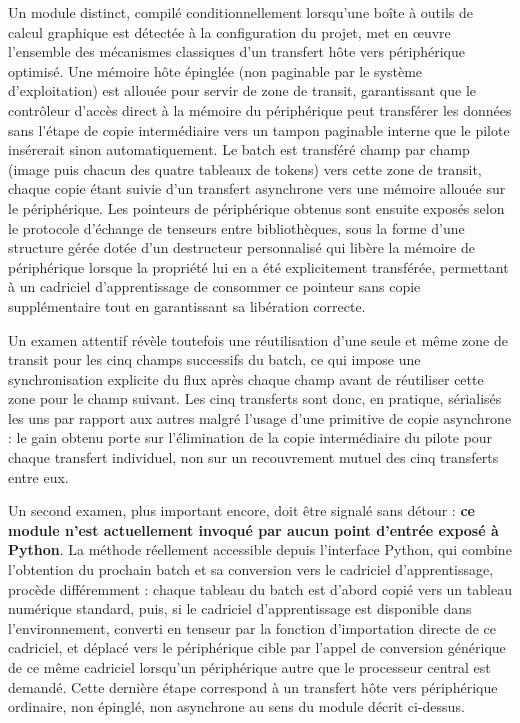 \documentclass[12pt,a4paper]{report}
\begin{document}
Un module distinct, compilé conditionnellement lorsqu'une boîte à outils de calcul graphique est détectée à la configuration du projet, met en œuvre l'ensemble des mécanismes classiques d'un transfert hôte vers périphérique optimisé. Une mémoire hôte épinglée (non paginable par le système d'exploitation) est allouée pour servir de zone de transit, garantissant que le contrôleur d'accès direct à la mémoire du périphérique peut transférer les données sans l'étape de copie intermédiaire vers un tampon paginable interne que le pilote insérerait sinon automatiquement. Le batch est transféré champ par champ (image puis chacun des quatre tableaux de tokens) vers cette zone de transit, chaque copie étant suivie d'un transfert asynchrone vers une mémoire allouée sur le périphérique. Les pointeurs de périphérique obtenus sont ensuite exposés selon le protocole d'échange de tenseurs entre bibliothèques, sous la forme d'une structure gérée dotée d'un destructeur personnalisé qui libère la mémoire de périphérique lorsque la propriété lui en a été explicitement transférée, permettant à un cadriciel d'apprentissage de consommer ce pointeur sans copie supplémentaire tout en garantissant sa libération correcte.

Un examen attentif révèle toutefois une réutilisation d'une seule et même zone de transit pour les cinq champs successifs du batch, ce qui impose une synchronisation explicite du flux après chaque champ avant de réutiliser cette zone pour le champ suivant. Les cinq transferts sont donc, en pratique, sérialisés les uns par rapport aux autres malgré l'usage d'une primitive de copie asynchrone : le gain obtenu porte sur l'élimination de la copie intermédiaire du pilote pour chaque transfert individuel, non sur un recouvrement mutuel des cinq transferts entre eux.

Un second examen, plus important encore, doit être signalé sans détour : \textbf{ce module n'est actuellement invoqué par aucun point d'entrée exposé à Python}. La méthode réellement accessible depuis l'interface Python, qui combine l'obtention du prochain batch et sa conversion vers le cadriciel d'apprentissage, procède différemment : chaque tableau du batch est d'abord copié vers un tableau numérique standard, puis, si le cadriciel d'apprentissage est disponible dans l'environnement, converti en tenseur par la fonction d'importation directe de ce cadriciel, et déplacé vers le périphérique cible par l'appel de conversion générique de ce même cadriciel lorsqu'un périphérique autre que le processeur central est demandé. Cette dernière étape correspond à un transfert hôte vers périphérique ordinaire, non épinglé, non asynchrone au sens du module décrit ci-dessus.
\end{document}
